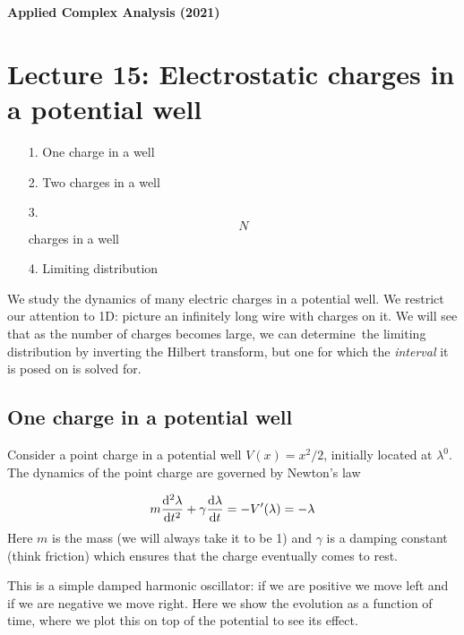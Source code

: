 \documentclass[12pt,a4paper]{article}
\def\D{ {\rm d} }
\def\dt{\D t}
\begin{document}
\textbf{Applied Complex Analysis (2021)}

\section{Lecture 15: Electrostatic charges in a potential well}
\begin{itemize}
\item[1. ] One charge in a well


\item[2. ] Two charges in a well


\item[3. ] \[
N
\]
charges in a well


\item[4. ] Limiting distribution

\end{itemize}
We study the dynamics of many electric charges in a potential well.  We restrict our attention to 1D: picture an infinitely long wire with charges on it. We will see that as the number of charges becomes large, we can determine the limiting distribution by inverting the Hilbert transform, but one for which the \emph{interval} it is posed on is solved for.

\subsection{One charge in a potential well}
Consider a point charge in a potential well $V(x) = x^2 / 2$, initially located at $\lambda^0$. The dynamics of the point charge are governed by Newton's law

\[
m { \D^2 \lambda \over \dt^2} + \gamma { \D \lambda \over \dt}  = -V'(\lambda) = -  \lambda
\]
Here $m$ is the mass (we will always take it to be 1) and $\gamma$ is a damping constant (think friction) which ensures that the charge eventually comes to rest.

This is a simple damped harmonic oscillator: if we are positive we move left and if we are negative we move right. Here we show the evolution as a function of time, where we plot this on top of the potential to see its effect.
\end{document}
